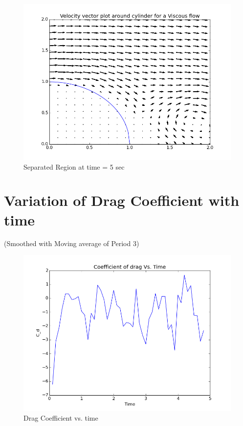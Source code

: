 \documentclass{article}
\begin{document}
\begin{figure}[H]   \label{figure}
\includegraphics[width=12cm]{streamlines_separated.png}
\caption{Separated Region at time = 5 sec}
\label{figure:}
\end{figure}
\newpage

\section{Variation of Drag Coefficient with time}
(Smoothed with Moving average of Period 3)
\begin{figure}[H]   \label{figure}
\includegraphics[width=12cm]{cd_V_time.png}
\caption{Drag Coefficient vs. time}
\label{figure:}
\end{figure}
\end{document}
